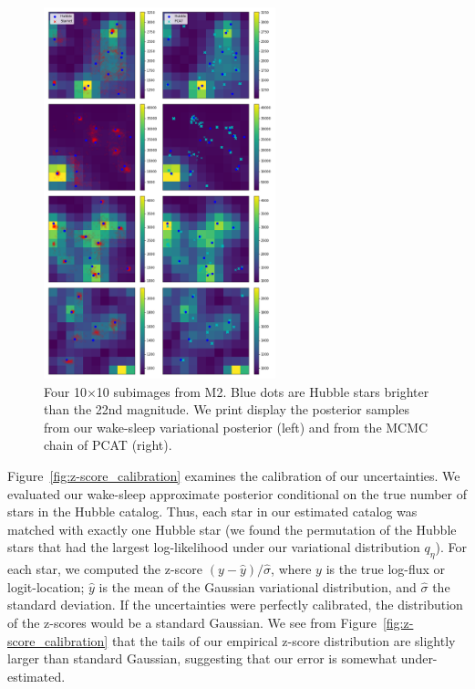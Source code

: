 \begin{figure}[ht]
    \centering
    \includegraphics[width=0.6\textwidth]{figures/example_subimages_samples.png}
    \caption{Four 10$\times$10 subimages from
    M2. Blue dots are Hubble stars brighter than the 22nd magnitude.
    We print display the posterior samples from our wake-sleep variational
    posterior (left) and from the MCMC chain of PCAT (right). }
    \label{fig:example_subimages_sampled}
\end{figure}

Figure~\ref{fig:z-score_calibration} examines the calibration of our uncertainties. We evaluated our wake-sleep approximate posterior 
conditional on the true number of stars in the Hubble catalog. 
Thus, each star in our estimated catalog was matched with exactly one Hubble star (we found the permutation of the Hubble stars that had the largest log-likelihood under our variational distribution $q_\eta$). For each star, we computed the z-score $(y - \hat y) / \hat \sigma$, where $y$ is the true log-flux or 
logit-location; $\hat y$ is the mean of the Gaussian variational distribution, and $\hat\sigma$ the standard deviation.
If the uncertainties were perfectly calibrated, the distribution of the z-scores would be a standard Gaussian. 
We see from Figure~\ref{fig:z-score_calibration} that 
the tails of our empirical z-score distribution are slightly larger than standard Gaussian, suggesting that our error is somewhat under-estimated. 

